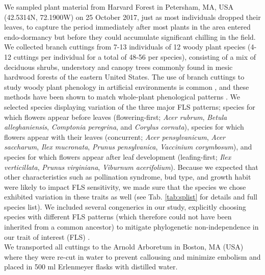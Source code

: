 \documentclass[12pt]{article}\usepackage[]{graphicx}\usepackage[]{color}
\begin{document}
\noindent We sampled plant material from Harvard Forest in Petersham, MA, USA (42.5314\degree N, 72.1900\degree W) on 25 October 2017, just as most individuals dropped their leaves, to capture the period immediately after most plants in the area entered endo-dormancy but before they could accumulate significant chilling in the field. We collected branch cuttings from 7-13 individuals of 12 woody plant species (4-12 cuttings per individual for a total of 48-56 per species), consisting of a mix of deciduous shrubs, understory and canopy trees commonly found in mesic hardwood forests of the eastern United States. The use of branch cuttings to study woody plant phenology in artificial environments is common \citep{Ettinger:2020aa}, and these methods have been shown to match whole-plant phenological patterns  \citep{Vitasse:2014aa,Primack2015}.
We selected species displaying variation of the three major FLS patterns; species for which flowers appear before leaves (flowering-first; \textit{Acer rubrum}, \textit{Betula alleghaniensis}, \textit{Comptonia peregrina}, and \textit{Corylus cornuta}), species for which flowers appear with their leaves (concurrent; \textit{Acer pensylvanicum}, \textit{Acer saccharum}, \textit{Ilex mucronata}, \textit{Prunus pensylvanica}, \textit{Vaccinium corymbosum}), and species for which flowers appear after leaf development (leafing-first; \textit{Ilex verticillata}, \textit{Prunus virginiana}, \textit{Viburnum acerifolium}). Because we expected that other characteristics such as pollination syndrome, bud type, and growth habit were likely to impact FLS sensitivity, we made sure that the species we chose exhibited variation in these traits as well  (see Tab. \ref{tab:splist} for details and full species list).  We included several congenerics in our study, explicitly choosing species with different FLS patterns (which therefore could not have been inherited from a common ancestor) to mitigate phylogenetic non-independence in our trait of interest (FLS) \citep{Revell:2010aa}.\\

We transported all cuttings to the Arnold Arboretum in Boston, MA (USA) where they were re-cut in water to prevent callousing and minimize embolism and placed in 500 ml Erlenmeyer flasks with distilled water.\\ 
\end{document}

